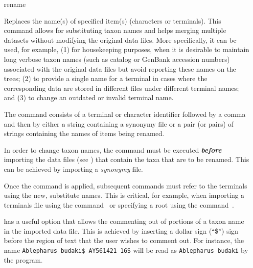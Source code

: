    
\begin{command}{rename}{}

    
    \begin{poydescription} 
        Replaces the name(s) of specified item(s) (characters or terminals). This command allows 
        for substituting taxon names and helps merging multiple datasets without modifying the original
        data files. More specifically, it can be used, for example, (1) for housekeeping purposes,
        when it is desirable to maintain long verbose taxon names (such as catalog or GenBank
        accession numbers) associated with the original data files but avoid reporting these 
        names on the trees; (2) to provide a single name for a terminal in cases where the corresponding
        data are stored in different files under different terminal names; and (3) to change an
        outdated or invalid terminal name.
        
        The command consists of a terminal or character identifier followed by a comma and then by
        either a string containing a synonymy file or a pair (or pairs) of strings containing the names of
        items being renamed.
    \end{poydescription}  
          
    \begin{statement}
        In order to change taxon names, the command  must be
        executed {\bf \emph{before}} importing the data files (see  )
        that contain the taxa that are to be renamed.  This can be achieved by importing a 
        \emph{synonymy} file.
    \end{statement}
          
    \begin{statement}
        Once the command  is applied, subsequent commands 
        must refer to the terminals using the new, substitute names. This is critical, for example,
        when importing a terminals file using the command~ or specifying
        a root using the command~.
    \end{statement}
          
    \begin{statement}
          \poy has a useful option that allows the commenting out of portions of a taxon name in the imported
          data file. This is achieved by inserting a dollar sign (``\$'') sign before the region of text that the user wishes to comment 
          out.  For instance, the name \texttt{Ablepharus\_budaki\$\_AY561421\_16S} will be read as 
          \texttt{Ablepharus\_budaki} by the program.
    \end{statement}
          

\end{command}
